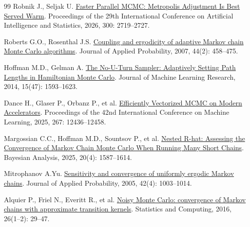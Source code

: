 \documentclass[UTF8,a4paper,zihao=-4,fontset=fandol]{ctexart}
\begin{document}
\begin{thebibliography}{99}
 Robnik J., Seljak U.
\href{https://proceedings.mlr.press/v300/robnik26a.html}{Faster Parallel MCMC: Metropolis Adjustment Is Best Served Warm}.
Proceedings of the 29th International Conference on Artificial Intelligence and Statistics, 2026, 300: 2719–2727.

 Roberts G.O., Rosenthal J.S.
\href{https://doi.org/10.1239/jap/1183667414}{Coupling and ergodicity of adaptive Markov chain Monte Carlo algorithms}.
Journal of Applied Probability, 2007, 44(2): 458–475.

 Hoffman M.D., Gelman A.
\href{https://jmlr.org/papers/v15/hoffman14a.html}{The No-U-Turn Sampler: Adaptively Setting Path Lengths in Hamiltonian Monte Carlo}.
Journal of Machine Learning Research, 2014, 15(47): 1593–1623.

 Dance H., Glaser P., Orbanz P., et al.
\href{https://proceedings.mlr.press/v267/dance25a.html}{Efficiently Vectorized MCMC on Modern Accelerators}.
Proceedings of the 42nd International Conference on Machine Learning, 2025, 267: 12436–12458.

 Margossian C.C., Hoffman M.D., Sountsov P., et al.
\href{https://doi.org/10.1214/24-BA1453}{Nested R-hat: Assessing the Convergence of Markov Chain Monte Carlo When Running Many Short Chains}.
Bayesian Analysis, 2025, 20(4): 1587–1614.

 Mitrophanov A.Yu.
\href{https://www.cambridge.org/core/journals/journal-of-applied-probability/article/sensitivity-and-convergence-of-uniformly-ergodic-markov-chains/26A9854BCB8D103B3A63A9B272616EC0}{Sensitivity and convergence of uniformly ergodic Markov chains}.
Journal of Applied Probability, 2005, 42(4): 1003–1014.

 Alquier P., Friel N., Everitt R., et al.
\href{https://link.springer.com/article/10.1007/s11222-014-9521-x}{Noisy Monte Carlo: convergence of Markov chains with approximate transition kernels}.
Statistics and Computing, 2016, 26(1–2): 29–47.

\end{thebibliography}
\end{document}
